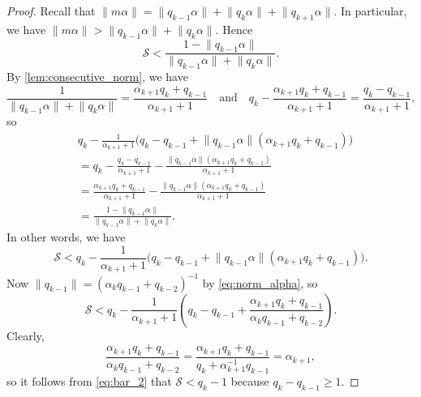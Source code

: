 \documentclass[a4paper,fleqn]{article}
\providecommand{\norm}[1]{\lVert#1\rVert}
\begin{document}
\begin{proof}
    Recall that $\norm{m\alpha} = \norm{q_{k-1}\alpha} + \norm{q_k\alpha} + \norm{q_{k+1}\alpha}$. In particular, we
    have $\norm{m\alpha} > \norm{q_{k-1}\alpha} + \norm{q_k\alpha}$. Hence
    \begin{equation*}
      \mathcal{S} < \frac{1 - \norm{q_{k-1}\alpha}}{\norm{q_{k-1}\alpha} + \norm{q_k\alpha}}.
    \end{equation*}
    By \autoref{lem:consecutive_norm}, we have
    \begin{equation*}
      \frac{1}{\norm{q_{k-1}\alpha} + \norm{q_k\alpha}} = \frac{\alpha_{k+1}q_k + q_{k-1}}{\alpha_{k+1} + 1} \quad \text{and} \quad q_k - \frac{\alpha_{k+1}q_k + q_{k-1}}{\alpha_{k+1} + 1} = \frac{q_k - q_{k-1}}{\alpha_{k+1} + 1},
    \end{equation*}
    so
    \begin{align*}
      &q_k - \frac{1}{\alpha_{k+1} + 1}\Big( q_k - q_{k-1} + \norm{q_{k-1}\alpha}(\alpha_{k+1}q_k + q_{k-1})\Big) \\
      &= q_k - \frac{q_k - q_{k-1}}{\alpha_{k+1} + 1} - \frac{\norm{q_{k-1}\alpha}(\alpha_{k+1}q_k + q_{k-1})}{\alpha_{k+1} + 1} \\
      &= \frac{\alpha_{k+1}q_k + q_{k-1}}{\alpha_{k+1} + 1} - \frac{\norm{q_{k-1}\alpha}(\alpha_{k+1}q_k + q_{k-1})}{\alpha_{k+1} + 1} \\
      &= \frac{1 - \norm{q_{k-1}\alpha}}{\norm{q_{k-1}\alpha} + \norm{q_k\alpha}}.
    \end{align*}
    In other words, we have
    \begin{equation*}
      \mathcal{S} < q_k - \frac{1}{\alpha_{k+1} + 1}\Big( q_k - q_{k-1} + \norm{q_{k-1}\alpha}(\alpha_{k+1}q_k + q_{k-1})\Big).
    \end{equation*}
    Now $\norm{q_{k-1}} = (\alpha_k q_{k-1} + q_{k-2})^{-1}$ by \eqref{eq:norm_alpha}, so
    \begin{equation}\label{eq:bar_2}
      \mathcal{S} < q_k - \frac{1}{\alpha_{k+1} + 1}\left( q_k - q_{k-1} + \frac{\alpha_{k+1}q_k + q_{k-1}}{\alpha_k q_{k-1} + q_{k-2}} \right).
    \end{equation}
    Clearly,
    \begin{equation*}
      \frac{\alpha_{k+1}q_k + q_{k-1}}{\alpha_k q_{k-1} + q_{k-2}} = \frac{\alpha_{k+1}q_k + q_{k-1}}{q_k + \alpha_{k+1}^{-1}q_{k-1}} = \alpha_{k+1},
    \end{equation*}
    so it follows from \eqref{eq:bar_2} that $\mathcal{S} < q_k - 1$ because $q_k - q_{k-1} \geq 1$.
  \end{proof}
\end{document}
